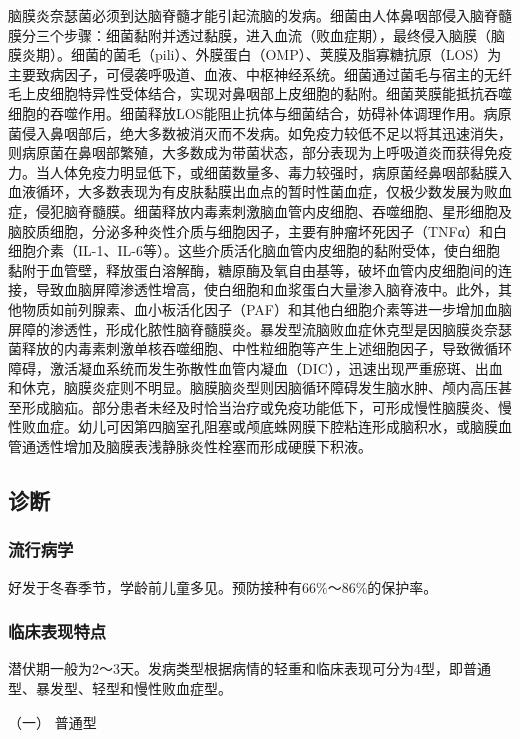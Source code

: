 脑膜炎奈瑟菌必须到达脑脊髓才能引起流脑的发病。细菌由人体鼻咽部侵入脑脊髓膜分三个步骤：细菌黏附并透过黏膜，进入血流（败血症期），最终侵入脑膜（脑膜炎期）。细菌的菌毛（pili）、外膜蛋白（OMP）、荚膜及脂寡糖抗原（LOS）为主要致病因子，可侵袭呼吸道、血液、中枢神经系统。细菌通过菌毛与宿主的无纤毛上皮细胞特异性受体结合，实现对鼻咽部上皮细胞的黏附。细菌荚膜能抵抗吞噬细胞的吞噬作用。细菌释放LOS能阻止抗体与细菌结合，妨碍补体调理作用。病原菌侵入鼻咽部后，绝大多数被消灭而不发病。如免疫力较低不足以将其迅速消失，则病原菌在鼻咽部繁殖，大多数成为带菌状态，部分表现为上呼吸道炎而获得免疫力。当人体免疫力明显低下，或细菌数量多、毒力较强时，病原菌经鼻咽部黏膜入血液循环，大多数表现为有皮肤黏膜出血点的暂时性菌血症，仅极少数发展为败血症，侵犯脑脊髓膜。细菌释放内毒素刺激脑血管内皮细胞、吞噬细胞、星形细胞及脑胶质细胞，分泌多种炎性介质与细胞因子，主要有肿瘤坏死因子（TNFα）和白细胞介素（IL-1、IL-6等）。这些介质活化脑血管内皮细胞的黏附受体，使白细胞黏附于血管壁，释放蛋白溶解酶，糖原酶及氧自由基等，破坏血管内皮细胞间的连接，导致血脑屏障渗透性增高，使白细胞和血浆蛋白大量渗入脑脊液中。此外，其他物质如前列腺素、血小板活化因子（PAF）和其他白细胞介素等进一步增加血脑屏障的渗透性，形成化脓性脑脊髓膜炎。暴发型流脑败血症休克型是因脑膜炎奈瑟菌释放的内毒素刺激单核吞噬细胞、中性粒细胞等产生上述细胞因子，导致微循环障碍，激活凝血系统而发生弥散性血管内凝血（DIC），迅速出现严重瘀斑、出血和休克，脑膜炎症则不明显。脑膜脑炎型则因脑循环障碍发生脑水肿、颅内高压甚至形成脑疝。部分患者未经及时恰当治疗或免疫功能低下，可形成慢性脑膜炎、慢性败血症。幼儿可因第四脑室孔阻塞或颅底蛛网膜下腔粘连形成脑积水，或脑膜血管通透性增加及脑膜表浅静脉炎性栓塞而形成硬膜下积液。

\subsection{诊断}

\subsubsection{流行病学}

好发于冬春季节，学龄前儿童多见。预防接种有66\%～86\%的保护率。

\subsubsection{临床表现特点}

潜伏期一般为2～3天。发病类型根据病情的轻重和临床表现可分为4型，即普通型、暴发型、轻型和慢性败血症型。

\hypertarget{text00231.htmlux5cux23CHP7-11-2-2-1}{}
（一） 普通型

